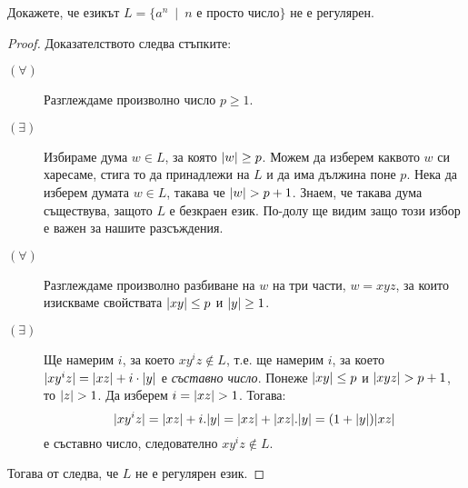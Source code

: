 \begin{problem}
  Докажете, че езикът $L = \{a^n\ \mid\ n\mbox{ е просто число}\}$ не е регулярен.
\end{problem}
\begin{proof}
  Доказателството следва стъпките:
  \begin{description}
  \item[$(\forall)$] 
    Разглеждаме произволно число $p \geq 1$.
  \item[$(\exists)$]
    Избираме дума $w \in L$, за която $\vert{w}\vert \geq p$. Можем да изберем каквото $w$ 
    си харесаме, стига то да принадлежи на $L$ и да има дължина поне $p$.
    Нека да изберем думата $w \in L$, такава че $\vert{w}\vert > p+1$.
    Знаем, че такава дума съществува, защото $L$ е безкраен език. По-долу ще видим защо този избор е важен за нашите разсъждения.
  \item[$(\forall)$]
    Разглеждаме произволно разбиване на $w$ на три части, $w = xyz$,
    за които изискваме свойствата $\vert{xy}\vert \leq p$ и $\vert{y}\vert \geq 1$.
  \item[$(\exists)$]
    Ще намерим $i$, за което $xy^iz \not\in L$,
    т.е. ще намерим $i$, за което 
    $\vert{xy^iz}\vert = \vert{xz}\vert + i\cdot\vert{y}\vert$ е {\em съставно число}.
    Понеже $\vert{xy}\vert \leq p$ и $\vert{xyz}\vert > p+1$, то $\vert{z}\vert > 1$.
    Да изберем $i = \vert{xz}\vert > 1$. Тогава:
    \[\vert{xy^iz}\vert = \vert{xz}\vert + i.\vert{y}\vert = \vert{xz}\vert + \vert{xz}\vert.\vert{y}\vert = (1 + \vert{y}\vert)\vert{xz}\vert\] е съставно число, следователно 
    $xy^iz \not\in L$.
  \end{description}
  Тогава от  следва, че $L$ не е регулярен език.
\end{proof}

